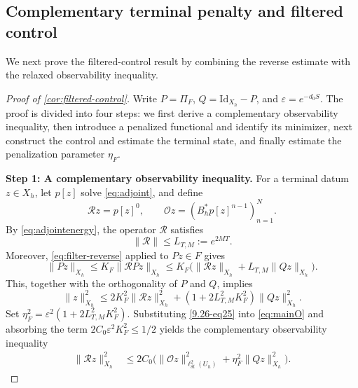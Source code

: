 \documentclass[print,wide,eng]{draft}
\begin{document}
\subsection{Complementary terminal penalty and filtered control}\label{sec:filter-control-proof}

We next prove the filtered-control result by combining the reverse estimate with the relaxed observability inequality.

\begin{proof}[Proof of \cref{cor:filtered-control}]
Write $P=\Pi_F$, $Q=\mathrm{Id}_{X_h}-P$, and $\varepsilon=e^{-d_0S}$. The proof is divided into four steps: we first derive a complementary observability inequality, then introduce a penalized functional and identify its minimizer, next construct the control and estimate the terminal state, and finally estimate the penalization parameter $\eta_F$.

\medskip

\textbf{Step 1: A complementary observability inequality.}
For a terminal datum $z\in X_h$, let $p[z]$ solve \cref{eq:adjoint}, and define
%
$$
\mathscr Rz=p[z]^0,\qquad
\mathscr Oz=(B_h^*p[z]^{n-1})_{n=1}^N.
$$
%
By \cref{eq:adjointenergy}, the operator $\mathscr R$ satisfies
%
$$
\|\mathscr R\|\le L_{T,M}:=e^{2MT}.
$$
%
Moreover, \cref{eq:filter-reverse} applied to $Pz\in F$ gives
%
\begin{equation}\label{9.26-eq24}
\|Pz\|_{X_h}\le K_F\|\mathscr RPz\|_{X_h}
\le K_F\bigl(\|\mathscr Rz\|_{X_h}+L_{T,M}\|Qz\|_{X_h}\bigr).
\end{equation}
%
This, together with  the orthogonality of $P$ and $Q$, implies
%
\begin{equation}\label{9.26-eq25}
\|z\|_{X_h}^2
\le 2K_F^2\|\mathscr Rz\|_{X_h}^2
+(1+2L_{T,M}^2K_F^2)\|Qz\|_{X_h}^2.
\end{equation}
%
Set
$
\eta_F^2=\varepsilon^2(1+2L_{T,M}^2K_F^2).
$
Substituting \eqref{9.26-eq25} into \cref{eq:mainO} and absorbing the term $2C_0\varepsilon^2K_F^2\le1/2$ yields the complementary observability inequality
\begin{align}\label{eq:filter-complementary-observability}
	\|\mathscr Rz\|_{X_h}^2
	&\le2C_0\bigl(\|\mathscr Oz\|_{\ell_{\delta t}^2(U_h)}^2+\eta_F^2\|Qz\|_{X_h}^2\bigr).
\end{align}

\medskip


\end{proof}
\end{document}
